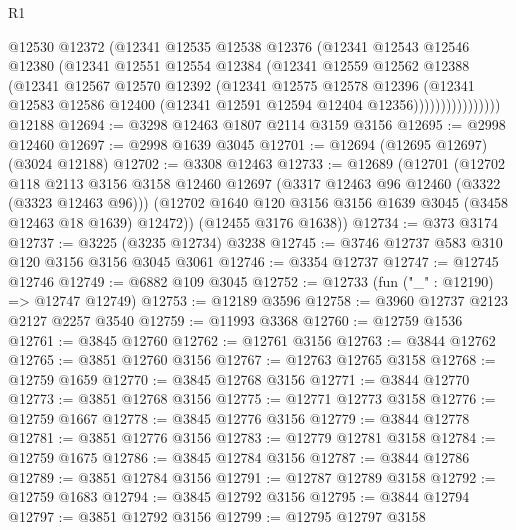 \begin{lexlean}{R1}
\begin{coremodule}
                    @12530
                    @12372
                    (@12341
                      @12535
                      @12538
                      @12376
                      (@12341
                        @12543
                        @12546
                        @12380
                        (@12341
                          @12551
                          @12554
                          @12384
                          (@12341
                            @12559
                            @12562
                            @12388
                            (@12341
                              @12567
                              @12570
                              @12392
                              (@12341
                                @12575
                                @12578
                                @12396
                                (@12341
                                  @12583
                                  @12586
                                  @12400
                                  (@12341 @12591 @12594 @12404 @12356))))))))))))))))
    @12188
@12694 := @3298 @12463 @1807 @2114 @3159 @3156
@12695 := @2998 @12460
@12697 := @2998 @1639 @3045
@12701 := @12694 (@12695 @12697) (@3024 @12188)
@12702 := @3308 @12463
@12733 := @12689
    (@12701
      (@12702
        @118
        @2113
        @3156
        @3158
        @12460
        @12697
        (@3317 @12463 @96 @12460 (@3322 (@3323 @12463 @96)))
        (@12702 @1640 @120 @3156 @3156 @1639 @3045 (@3458 @12463 @18 @1639) @12472))
      (@12455 @3176 @1638))
@12734 := @373 @3174
@12737 := @3225 (@3235 @12734) @3238
@12745 := @3746 @12737 @583 @310 @120 @3156 @3156 @3045 @3061
@12746 := @3354 @12737
@12747 := @12745 @12746
@12749 := @6882 @109 @3045
@12752 := @12733 (fun ("_" : @12190) => @12747 @12749)
@12753 := @12189 @3596
@12758 := @3960 @12737 @2123 @2127 @2257 @3540
@12759 := @11993 @3368
@12760 := @12759 @1536
@12761 := @3845 @12760
@12762 := @12761 @3156
@12763 := @3844 @12762
@12765 := @3851 @12760 @3156
@12767 := @12763 @12765 @3158
@12768 := @12759 @1659
@12770 := @3845 @12768 @3156
@12771 := @3844 @12770
@12773 := @3851 @12768 @3156
@12775 := @12771 @12773 @3158
@12776 := @12759 @1667
@12778 := @3845 @12776 @3156
@12779 := @3844 @12778
@12781 := @3851 @12776 @3156
@12783 := @12779 @12781 @3158
@12784 := @12759 @1675
@12786 := @3845 @12784 @3156
@12787 := @3844 @12786
@12789 := @3851 @12784 @3156
@12791 := @12787 @12789 @3158
@12792 := @12759 @1683
@12794 := @3845 @12792 @3156
@12795 := @3844 @12794
@12797 := @3851 @12792 @3156
@12799 := @12795 @12797 @3158

\end{coremodule}
\end{lexlean}
